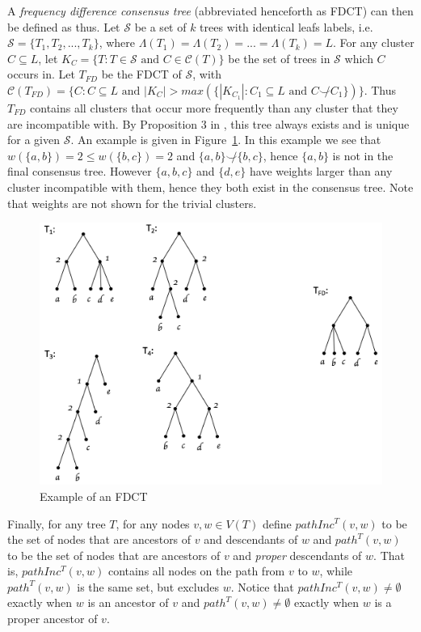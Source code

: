 \documentclass{article}
\newcommand{\compatible}{\smile}
\newcommand{\leafset}{\Lambda}
\begin{document}
    A \textit{frequency difference consensus tree} (abbreviated henceforth as FDCT) can then be defined as thus. Let $\mathcal{S}$ be a set of $k$ trees with identical leafs labels, i.e. $\mathcal{S} = \{T_1, T_2, ..., T_k\}$, where $\leafset(T_1) = \leafset(T_2) = ... = \leafset(T_k) = L$. For any cluster $C \subseteq L$, let $K_C = \{T : T \in \mathcal{S} \text{ and } C \in \mathcal{C}(T)\}$ be the set of trees in $\mathcal{S}$ which $C$ occurs in. Let $T_{FD}$ be the FDCT of $\mathcal{S}$, with $\mathcal{C}(T_{FD}) = \{C : C \subseteq L \text{ and } |K_C| > max(\{|K_{C_1}| : C_1 \subseteq L \text{ and } C \not\compatible C_1\})\}$. Thus $T_{FD}$ contains all clusters that occur more frequently than any cluster that they are incompatible with. By Proposition $3$ in \cite{steel2014axiomatic}, this tree always exists and is unique for a given $\mathcal{S}$. An example is given in Figure~\ref{fig:freqdiff}. In this example we see that $w(\{a, b\}) = 2 \leq w(\{b, c\}) = 2$ and $\{a, b\} \not\compatible \{b, c\}$, hence $\{a, b\}$ is not in the final consensus tree. However $\{a, b, c\}$ and $\{d, e\}$ have weights larger than any cluster incompatible with them, hence they both exist in the consensus tree. Note that weights are not shown for the trivial clusters.

    \begin{figure}[h]
        \includegraphics[scale=0.5]{freqdiff}
        \centering
        \caption{Example of an FDCT}
        \label{fig:freqdiff}
    \end{figure}

    Finally, for any tree $T$, for any nodes $v, w \in V(T)$ define $pathInc^{T}(v, w)$ to be the set of nodes that are ancestors of $v$ and descendants of $w$ and $path^{T}(v, w)$ to be the set of nodes that are ancestors of $v$ and \textit{proper} descendants of $w$. That is, $pathInc^{T}(v, w)$ contains all nodes on the path from $v$ to $w$, while $path^{T}(v, w)$ is the same set, but excludes $w$. Notice that $pathInc^{T}(v, w) \neq \emptyset$ exactly when $w$ is an ancestor of $v$ and $path^{T}(v, w) \neq \emptyset$ exactly when $w$ is a proper ancestor of $v$.
\end{document}
